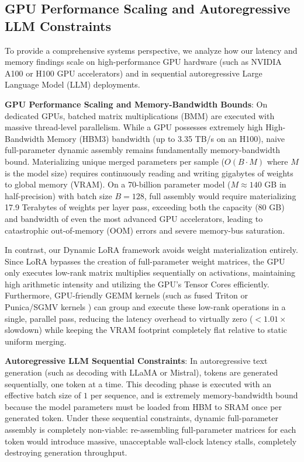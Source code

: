\documentclass{article}
\theoremstyle{plain}
\theoremstyle{definition}
\theoremstyle{remark}
\begin{document}
\subsection{GPU Performance Scaling and Autoregressive LLM Constraints}
\label{subsec:gpu_and_llm_analysis}
To provide a comprehensive systems perspective, we analyze how our latency and memory findings scale on high-performance GPU hardware (such as NVIDIA A100 or H100 GPU accelerators) and in sequential autoregressive Large Language Model (LLM) deployments.

\textbf{GPU Performance Scaling and Memory-Bandwidth Bounds}:
On dedicated GPUs, batched matrix multiplications (BMM) are executed with massive thread-level parallelism. While a GPU possesses extremely high High-Bandwidth Memory (HBM3) bandwidth (up to 3.35 TB/s on an H100), naive full-parameter dynamic assembly remains fundamentally memory-bandwidth bound. Materializing unique merged parameters per sample ($O(B \cdot M)$ where $M$ is the model size) requires continuously reading and writing gigabytes of weights to global memory (VRAM). On a 70-billion parameter model ($M \approx 140$ GB in half-precision) with batch size $B=128$, full assembly would require materializing 17.9 Terabytes of weights per layer pass, exceeding both the capacity (80 GB) and bandwidth of even the most advanced GPU accelerators, leading to catastrophic out-of-memory (OOM) errors and severe memory-bus saturation.

In contrast, our Dynamic LoRA framework avoids weight materialization entirely. Since LoRA bypasses the creation of full-parameter weight matrices, the GPU only executes low-rank matrix multiplies sequentially on activations, maintaining high arithmetic intensity and utilizing the GPU's Tensor Cores efficiently. Furthermore, GPU-friendly GEMM kernels (such as fused Triton or Punica/SGMV kernels \cite{chen2019triton}) can group and execute these low-rank operations in a single, parallel pass, reducing the latency overhead to virtually zero ($<1.01\times$ slowdown) while keeping the VRAM footprint completely flat relative to static uniform merging.

\textbf{Autoregressive LLM Sequential Constraints}:
In autoregressive text generation (such as decoding with LLaMA or Mistral), tokens are generated sequentially, one token at a time. This decoding phase is executed with an effective batch size of $1$ per sequence, and is extremely memory-bandwidth bound because the model parameters must be loaded from HBM to SRAM once per generated token. Under these sequential constraints, dynamic full-parameter assembly is completely non-viable: re-assembling full-parameter matrices for each token would introduce massive, unacceptable wall-clock latency stalls, completely destroying generation throughput.
\end{document}
